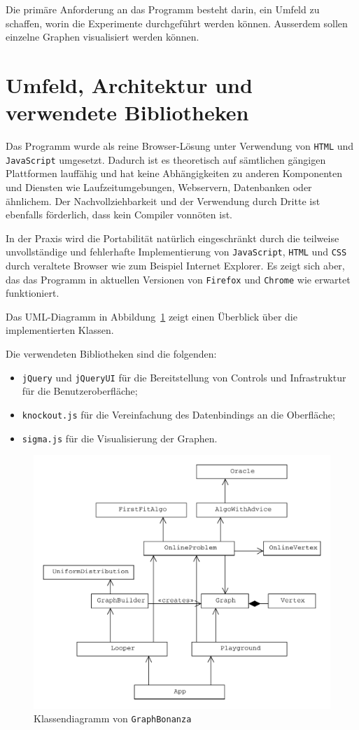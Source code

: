 \documentclass[11pt,abstracton]{scrreprt} %
\theoremstyle{definition}
\begin{document}
Die primäre Anforderung an das Programm besteht darin, ein Umfeld zu schaffen, worin die Experimente durchgeführt werden können. Ausserdem sollen einzelne Graphen visualisiert werden können.

\section{Umfeld, Architektur und verwendete Bibliotheken}

Das Programm wurde als reine Browser-Lösung unter Verwendung von {\tt HTML} und {\tt JavaScript} umgesetzt. Dadurch ist es theoretisch auf sämtlichen gängigen Plattformen lauffähig und hat keine Abhängigkeiten zu anderen Komponenten und Diensten wie Laufzeitumgebungen, Webservern, Datenbanken oder ähnlichem. Der Nachvollziehbarkeit und der Verwendung durch Dritte ist ebenfalls förderlich, dass kein Compiler vonnöten ist.

In der Praxis wird die Portabilität natürlich eingeschränkt durch die teilweise unvollständige und fehlerhafte Implementierung von {\tt JavaScript}, {\tt HTML} und {\tt CSS} durch veraltete Browser wie zum Beispiel Internet Explorer. Es zeigt sich aber, das das Programm in aktuellen Versionen von {\tt Firefox} und {\tt Chrome} wie erwartet funktioniert.

\bigskip
Das UML-Diagramm in Abbildung~\ref{fig.arch} zeigt einen Überblick über die implementierten Klassen.

Die verwendeten Bibliotheken sind die folgenden:
\begin{itemize}
\item {\tt jQuery} und {\tt jQueryUI} für die Bereitstellung von Controls und Infrastruktur für die Benutzeroberfläche;
\item {\tt knockout.js} für die Vereinfachung des Datenbindings an die Oberfläche;
\item {\tt sigma.js} für die Visualisierung der Graphen.
\end{itemize}

\begin{figure}
\caption{Klassendiagramm von {\tt GraphBonanza}}
\label{fig.arch}
\includegraphics[scale=0.5]{arch.pdf}
\end{figure}
\end{document}
